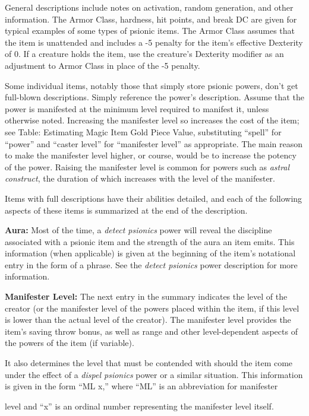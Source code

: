 \documentclass{article}
\begin{document}
General descriptions include notes on activation, random generation, and other 
information. The Armor Class, hardness, hit points, and break DC are given for 
typical examples of some types of psionic items. The Armor Class assumes that the 
item is unattended and includes a -5 penalty for the item's effective Dexterity 
of 0. If a creature holds the item, use the creature's Dexterity modifier as an 
adjustment to Armor Class in place of the -5 penalty.

Some individual items, notably those that simply store psionic powers, don't get 
full-blown descriptions. Simply reference the power's description. Assume that 
the power is manifested at the minimum level required to manifest it, unless otherwise 
noted. Increasing the manifester level so increases the cost of the item; see Table: 
Estimating Magic Item Gold Piece Value,\textit{ }substituting ``spell'' for ``power'' 
and ``caster level'' for ``manifester level'' as appropriate. The main reason to 
make the manifester level higher, or course, would be to increase the potency of 
the power. Raising the manifester level is common for powers such as \textit{astral 
construct}, the duration of which increases with the level of the manifester.

Items with full descriptions have their abilities detailed, and each of the following 
aspects of these items is summarized at the end of the description.

\textbf{Aura:} Most of the time, a \textit{detect psionics }power will reveal the 
discipline associated with a psionic item and the strength of the aura an item 
emits. This information (when applicable) is given at the beginning of the item's 
notational entry in the form of a phrase. See the \textit{detect psionics }power 
description for more information.

\textbf{Manifester Level:} The next entry in the summary indicates the level of 
the creator (or the manifester level of the powers placed within the item, if this 
level is lower than the actual level of the creator). The manifester level provides 
the item's saving throw bonus, as well as range and other level-dependent aspects 
of the powers of the item (if variable).

It also determines the level that must be contended with should the item come under 
the effect of a \textit{dispel psionics }power or a similar situation. This information 
is given in the form ``ML x,'' where ``ML'' is an abbreviation for manifester

level and ``x'' is an ordinal number representing the manifester level itself.
\end{document}
